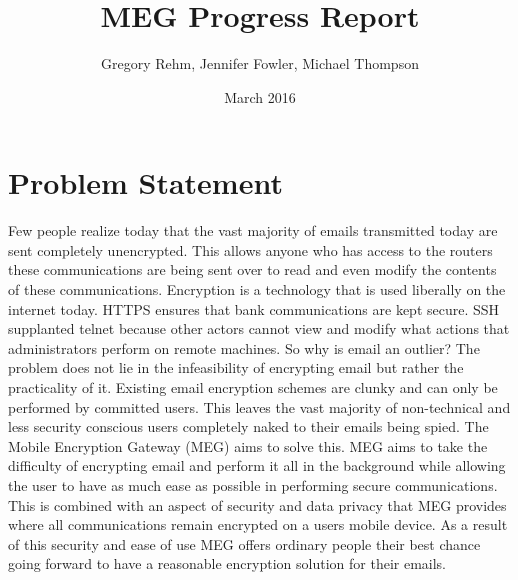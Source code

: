 \documentclass{article}
\title{MEG Progress Report}
\author{Gregory Rehm, Jennifer Fowler, Michael Thompson}
\affil{\normalsize{University of California Davis}, \normalsize{Argonne National Laboratory} \texttt{grehm@ucdavis.edu \{jfowler,thompsonm\}@anl.ogv}}
\date{March 2016}
\begin{document}
\maketitle

\section{Problem Statement}
\par Few people realize today that the vast majority of emails transmitted today are sent completely unencrypted. This allows anyone who has access to the routers these communications are being sent over to read and even modify the contents of these communications. Encryption is a technology that is used liberally on the internet today. HTTPS ensures that bank communications are kept secure. SSH supplanted telnet because other actors cannot view and modify what actions that administrators perform on remote machines. So why is email an outlier? The problem does not lie in the infeasibility of encrypting email but rather the practicality of it. Existing email encryption schemes are clunky and can only be performed by committed users. This leaves the vast majority of non-technical and less security conscious users completely naked to their emails being spied. The Mobile Encryption Gateway (MEG) aims to solve this. MEG aims to take the difficulty of encrypting email and perform it all in the background while allowing the user to have as much ease as possible in performing secure communications. This is combined with an aspect of security and data privacy that MEG provides where all communications remain encrypted on a users mobile device. As a result of this security and ease of use MEG offers ordinary people their best chance going forward to have a reasonable encryption solution for their emails.
\end{document}
